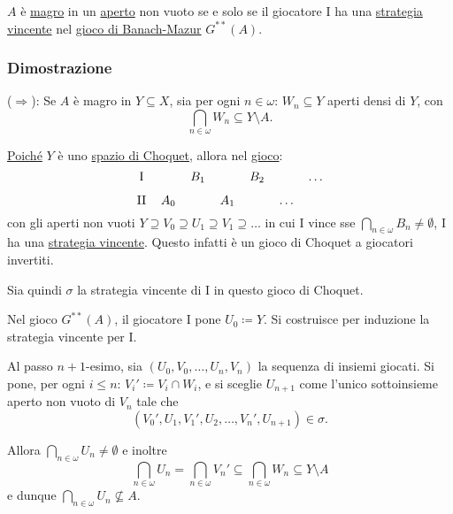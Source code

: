\documentclass{article}
\newcommand{\1}{\mathds{1}}
\begin{document}
\(A\) è \href{../../../../../../../org/roam/20250419122752-insieme_magro.org}{magro} in un \href{../../../../../../../org/roam/20250103145124-topologia.org}{aperto} non vuoto se e solo se il giocatore I ha una \hyperref[sec:org1db90c5]{strategia vincente} nel \hyperref[sec:orge8e0b9e]{gioco di Banach-Mazur} \(G^{**}(A)\).
\subsubsection{Dimostrazione}
\label{sec:org20477db}

(\(\Rightarrow\)): Se \(A\) è magro in \(Y \subseteq X\), sia per ogni \(n \in \omega\): \(W_{n} \subseteq Y\) aperti densi di \(Y\), con
\begin{equation*}
\bigcap_{n \in\omega} W_{n} \subseteq Y \setminus A.
\end{equation*}

\hyperref[sec:orge945bdd]{Poiché} \(Y\) è uno \hyperref[sec:org12a4e1c]{spazio di Choquet}, allora nel \hyperref[sec:org21a45cb]{gioco}:
\begin{equation*}
\begin{tikzcd}[ampersand replacement=\&,cramped, sep=tiny]
	{\text{I}} \&\& {B_1} \&\& {B_2} \&\& \dots \\
	{\text{II}} \& {A_0} \&\& {A_1} \&\& \dots
\end{tikzcd}
\end{equation*}
con gli aperti non vuoti \(Y\supseteq V_{0}\supseteq U_{1}\supseteq V_{1}\supseteq \dots\) in cui I vince sse \(\bigcap_{n \in \omega}{B_{n}} \neq \emptyset\), I ha una \hyperref[sec:org1db90c5]{strategia vincente}. Questo infatti è un gioco di Choquet a giocatori invertiti.

Sia quindi \(\sigma\) la strategia vincente di I in questo gioco di Choquet.

Nel gioco \(G^{**}(A)\), il giocatore I pone \(U_{0} \coloneqq Y\). Si costruisce per induzione la strategia vincente per I.

Al passo \(n+1\)-esimo, sia \((U_{0},V_{0},\dots, U_{n}, V_{n})\) la sequenza di insiemi giocati. Si pone, per ogni \(i\le n\): \(V_{i}'\coloneqq V_{i}\cap W_{i}\), e si sceglie \(U_{n+1}\) come l'unico sottoinsieme aperto non vuoto di \(V_{n}\) tale che
\begin{equation*}
(V_{0}', U_{1}, V_{1}', U_{2},\dots, V_{n}', U_{n+1}) \in\sigma.
\end{equation*}

Allora \(\bigcap_{n \in \omega} U_{n}\neq\emptyset\) e inoltre
\begin{equation*}
\bigcap_{n \in\omega} U_{n} = \bigcap_{n \in\omega} V_{n}' \subseteq \bigcap_{n \in \omega} W_{n} \subseteq Y\setminus A
\end{equation*}
e dunque \(\bigcap_{n \in\omega} U_{n} \not\subseteq A\).
\end{document}
